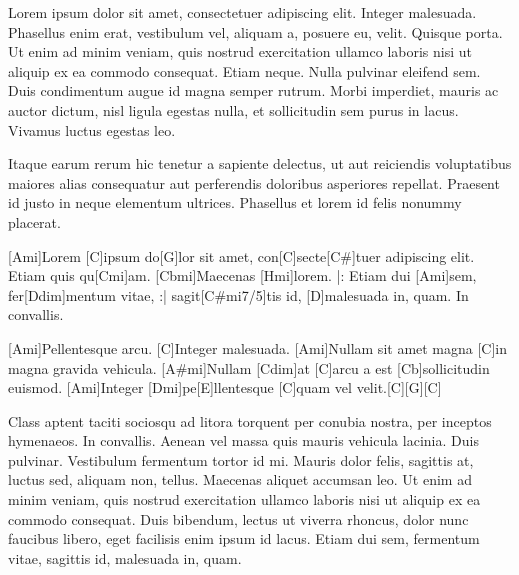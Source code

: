 \documentclass{article}
\begin{document}
Lorem ipsum dolor sit amet, consectetuer adipiscing elit. Integer malesuada.
Phasellus enim erat, vestibulum vel, aliquam a, posuere eu, velit. Quisque porta.
Ut enim ad minim veniam, quis nostrud exercitation ullamco laboris 
nisi ut aliquip ex ea commodo consequat. Etiam neque. Nulla pulvinar eleifend sem. 
Duis condimentum augue id magna semper rutrum. Morbi imperdiet, mauris ac auctor 
dictum, nisl ligula egestas nulla, et sollicitudin sem purus in lacus. Vivamus 
luctus egestas leo.

Itaque earum rerum hic tenetur a sapiente delectus, ut aut reiciendis voluptatibus 
maiores alias consequatur aut perferendis doloribus asperiores repellat. Praesent 
id justo in neque elementum ultrices. Phasellus et lorem id felis nonummy placerat.

\begin{guitar}
\strophe{}[Ami]Lorem [C]ipsum do[G]lor sit amet,
con[C]secte[C#]tuer adipiscing elit.
Etiam quis qu[Cmi]am. [Cbmi]Maecenas [Hmi]lorem.
|: Etiam dui [Ami]sem, fer[Ddim]mentum vitae, :|
sagit[C#mi7/5]tis id, [D]malesuada in, quam. In convallis.

[Ami]Pellentesque arcu. [C]Integer malesuada.
[Ami]Nullam sit amet magna [C]in magna gravida vehicula.
[A#mi]Nullam [Cdim]at [C]arcu a est [Cb]sollicitudin euismod.
[Ami]Integer [Dmi]pe[E]llentesque [C]quam vel velit.[C][G][C]
\end{guitar}

Class aptent taciti sociosqu ad litora torquent per conubia nostra, per inceptos 
hymenaeos. In convallis. Aenean vel massa quis mauris vehicula lacinia. Duis 
pulvinar. Vestibulum fermentum tortor id mi. Mauris dolor felis, sagittis at, 
luctus sed, aliquam non, tellus. Maecenas aliquet accumsan leo. Ut enim ad minim 
veniam, quis nostrud exercitation ullamco laboris nisi ut aliquip ex ea commodo 
consequat. Duis bibendum, lectus ut viverra rhoncus, dolor nunc faucibus libero, 
eget facilisis enim ipsum id lacus. Etiam dui sem, fermentum vitae, sagittis id, 
malesuada in, quam. 
\end{document}
